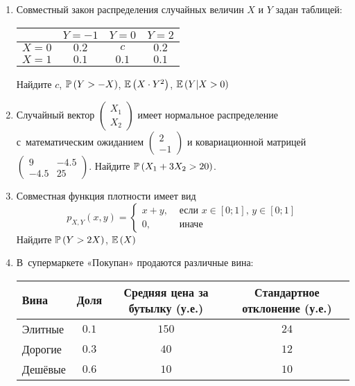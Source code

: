 \begin{enumerate}
\item Совместный закон распределения случайных величин  $X$  и  $Y$
задан таблицей:

\begin{center}
\begin{tabular}{@{}cccc@{}}
\toprule
    & $Y=-1$ & $Y=0$ & $Y=2$ \\ \midrule
$X=0$ & $0.2$  & $c$   & $0.2$ \\
$X=1$ & $0.1$  & $0.1$ & $0.1$ \\ \bottomrule
\end{tabular}
\end{center}

Найдите  $c$,  $\P\left(Y>-X\right)$,  $\E\left(X\cdot Y^{2} \right)$,  $\E\left(Y|X>0\right)$

\item Случайный вектор  $\left(\begin{array}{c}
{X_{1} } \\ {X_{2} }
\end{array}\right)$  имеет нормальное распределение с~математическим ожиданием  $\left(\begin{array}{c} {2} \\ {-1}
\end{array}\right)$  и ковариационной матрицей
$\left(\begin{array}{cc} {9} & {-4.5} \\ {-4.5} & {25}
\end{array}\right)$. Найдите  $\P\left(X_{1} +3X_{2} >20\right)$.

\item Совместная функция плотности имеет вид
\[
p_{X,Y} \left(x,y\right)=
\begin{cases}
x+y, & \text{ если } x\in \left[0;1\right],\, y\in \left[0;1\right] \\
0, & \text{ иначе}
\end{cases}
\]
Найдите  $\P\left(Y>2X\right)$,  $\E\left(X\right)$

\item В~супермаркете «Покупан» продаются различные вина:

\begin{center}
\begin{tabular}{@{}lccc@{}}
\toprule
Вина    & Доля & Средняя цена за бутылку (у.е.) & Стандартное отклонение (у.е.) \\ \midrule
Элитные & $0.1$  & $150$                           & $24$                           \\
Дорогие & $0.3$  & $40$                             & $12$                            \\
Дешёвые & $0.6$  & $10$                             & $10$                            \\ \bottomrule
\end{tabular}
\end{center}


\end{enumerate}
